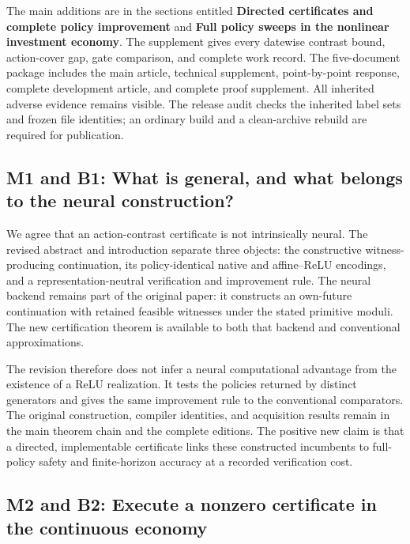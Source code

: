 \documentclass[ecta,nameyear,draft]{econsocart}
\begin{document}
The main additions are in the sections entitled \textbf{Directed
certificates and complete policy improvement} and \textbf{Full policy
sweeps in the nonlinear investment economy}. The supplement gives every
datewise contrast bound, action-cover gap, gate comparison, and complete
work record. The five-document package includes the main article,
technical supplement, point-by-point response, complete development
article, and complete proof supplement. All inherited adverse evidence
remains visible. The release audit checks the inherited label sets and
frozen file identities; an ordinary build and a clean-archive rebuild
are required for publication.

\hypertarget{m1-and-b1-what-is-general-and-what-belongs-to-the-neural-construction}{%
\subsection{M1 and B1: What is general, and what belongs to the neural
construction?}\label{m1-and-b1-what-is-general-and-what-belongs-to-the-neural-construction}}

We agree that an action-contrast certificate is not intrinsically
neural. The revised abstract and introduction separate three objects:
the constructive witness-producing continuation, its policy-identical
native and affine--ReLU encodings, and a representation-neutral
verification and improvement rule. The neural backend remains part of
the original paper: it constructs an own-future continuation with
retained feasible witnesses under the stated primitive moduli. The new
certification theorem is available to both that backend and conventional
approximations.

The revision therefore does not infer a neural computational advantage
from the existence of a ReLU realization. It tests the policies returned
by distinct generators and gives the same improvement rule to the
conventional comparators. The original construction, compiler
identities, and acquisition results remain in the main theorem chain and
the complete editions. The positive new claim is that a directed,
implementable certificate links these constructed incumbents to
full-policy safety and finite-horizon accuracy at a recorded
verification cost.

\hypertarget{m2-and-b2-execute-a-nonzero-certificate-in-the-continuous-economy}{%
\subsection{M2 and B2: Execute a nonzero certificate in the continuous
economy}\label{m2-and-b2-execute-a-nonzero-certificate-in-the-continuous-economy}}
\end{document}
